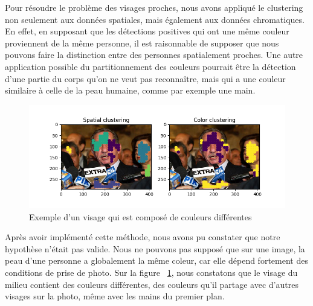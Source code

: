 \documentclass[a4paper,11pt]{article}
\begin{document}
Pour résoudre le problème des visages proches, nous avons appliqué le clustering non seulement aux données spatiales, mais également aux données chromatiques.
En effet, en supposant que les détections positives qui ont une même couleur proviennent de la même personne, il est raisonnable de supposer que nous pouvons faire la distinction entre des personnes spatialement proches.
Une autre application possible du partitionnement des couleurs pourrait être la détection d'une partie du corps qu'on ne veut pas reconnaître, mais qui a une couleur similaire à celle de la peau humaine, comme par exemple une main.
\newline
\begin{figure}[H]
\begin{center}
    \includegraphics[scale=0.5]{color_clustering_different_people.png}
    \caption{Exemple d'un visage qui est composé de couleurs différentes} \end{center}
    \label{fig:color_clustering_different_people}
\end{figure}
Après avoir implémenté cette méthode, nous avons pu constater que notre hypothèse n'était pas valide.
Nous ne pouvons pas supposé que sur une image, la peau d'une personne a globalement la même coleur, car elle dépend fortement des conditions de prise de photo.
Sur la figure ~\ref{fig:color_clustering_different_people}, nous constatons que le visage du milieu contient des couleurs différentes, des couleurs qu'il partage avec d'autres visages sur la photo, même avec les mains du premier plan.
\end{document}
